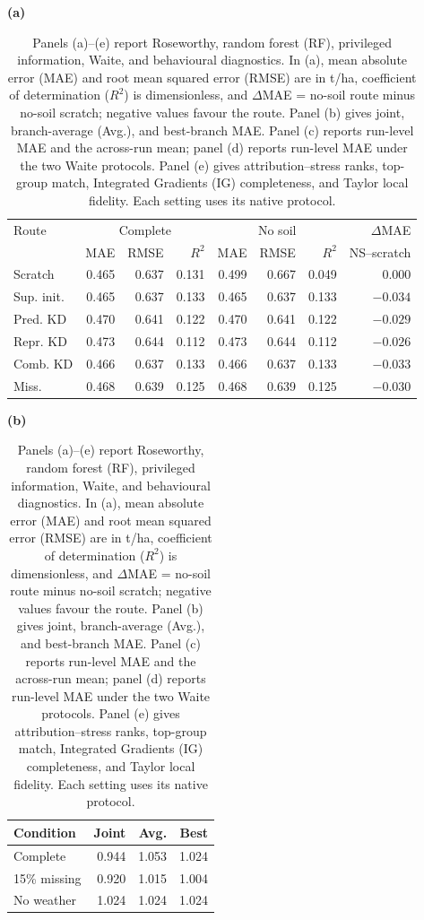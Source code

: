 \documentclass[runningheads]{venue/lncs/llncs}
\begin{document}
\begin{table}[t]
\centering
\small
\setlength{\tabcolsep}{3.0pt}
\renewcommand{\arraystretch}{0.94}
\caption{Panels (a)--(e) report Roseworthy, random forest (RF), privileged information, Waite, and behavioural diagnostics. In (a), mean absolute error (MAE) and root mean squared error (RMSE) are in t/ha, coefficient of determination ($R^2$) is dimensionless, and $\Delta$MAE = no-soil route minus no-soil scratch; negative values favour the route. Panel (b) gives joint, branch-average (Avg.), and best-branch MAE. Panel (c) reports run-level MAE and the across-run mean; panel (d) reports run-level MAE under the two Waite protocols. Panel (e) gives attribution--stress ranks, top-group match, Integrated Gradients (IG) completeness, and Taylor local fidelity. Each setting uses its native protocol.}
\label{tab:cross-scale}
\textbf{(a)}\\[-2pt]
\begin{tabular}{@{}lrrrrrrr@{}}
\toprule
Route & \multicolumn{3}{c}{Complete} & \multicolumn{3}{c}{No soil} & $\Delta$MAE\\
 & MAE & RMSE & $R^2$ & MAE & RMSE & $R^2$ & NS--scratch\\
\midrule
Scratch & 0.465 & 0.637 & 0.131 & 0.499 & 0.667 & 0.049 & 0.000\\
Sup. init. & 0.465 & 0.637 & 0.133 & 0.465 & 0.637 & 0.133 & $-0.034$\\
Pred. KD & 0.470 & 0.641 & 0.122 & 0.470 & 0.641 & 0.122 & $-0.029$\\
Repr. KD & 0.473 & 0.644 & 0.112 & 0.473 & 0.644 & 0.112 & $-0.026$\\
Comb. KD & 0.466 & 0.637 & 0.133 & 0.466 & 0.637 & 0.133 & $-0.033$\\
Miss. & 0.468 & 0.639 & 0.125 & 0.468 & 0.639 & 0.125 & $-0.030$\\
\bottomrule
\end{tabular}

\vspace{4pt}
\begin{minipage}[t]{.49\linewidth}
\centering
\scriptsize
\textbf{(b)}\\[-2pt]
\begin{tabular}{@{}lrrr@{}}
\toprule
Condition & Joint & Avg. & Best\\
\midrule
Complete & 0.944 & 1.053 & 1.024\\
15\% missing & 0.920 & 1.015 & 1.004\\
No weather & 1.024 & 1.024 & 1.024\\
\bottomrule
\end{tabular}


\end{minipage}
\end{table}
\end{document}
